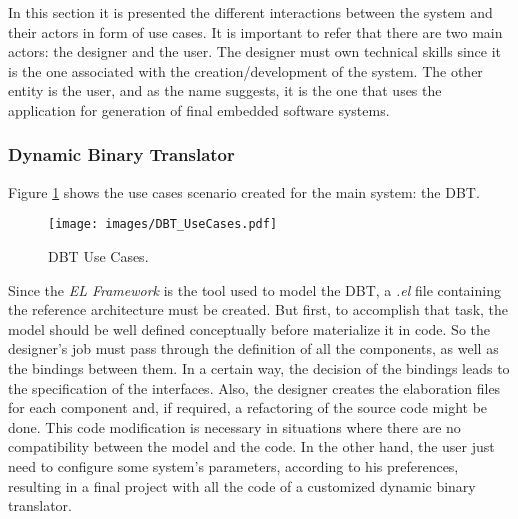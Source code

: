 In this section it is presented the different interactions between the system and their actors in form of use cases. It is important to refer that there are two main actors: the designer and the user. The designer must own technical skills since it is the one associated with the creation/development of the system. The other entity is the user, and as the name suggests, it is the one that uses the application for generation of final embedded software systems.


\subsubsection{Dynamic Binary Translator}

Figure \ref{fig:DBTUseCases} shows the use cases scenario created for the main system: the DBT.

\begin{figure}[!htb]
\centerline{
\texttt{[image: images/DBT\_UseCases.pdf]} }
\caption{DBT Use Cases.}
\label{fig:DBTUseCases} 
\end{figure}

Since the \textit{EL Framework} is the tool used to model the DBT, a \textit{.el} file containing the reference architecture must be created. But first, to accomplish that task, the model should be well defined conceptually before materialize it in code. So the designer's job must pass through the definition of all the components, as well as the bindings between them. In a certain way, the decision of the bindings leads to the specification of the interfaces. Also, the designer creates the elaboration files for each component and, if required, a refactoring of the source code might be done. This code modification is necessary in situations where there are no compatibility between the model and the code. In the other hand, the user just need to configure some system's parameters, according to his preferences, resulting in a final project with all the code of a customized dynamic binary translator.

%
%
%
